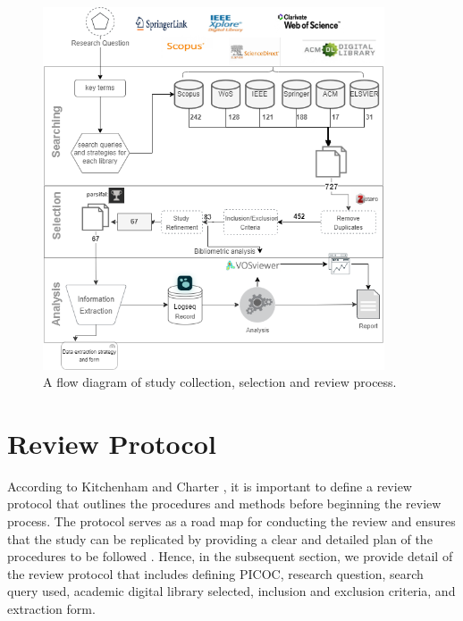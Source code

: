 \begin{figure}[H]
    \centering
    \includegraphics[width=0.9\textwidth]{images/newimages/slrmethoddiagram.drawio2.png}
    \caption{A flow diagram of study collection, selection and review process.}
    \label{fig:slr-proc}
\end{figure}




\section{Review Protocol}
According to Kitchenham and Charter  \cite{kitchenham_guidelines_2007}, it is important to define a review protocol that outlines the procedures and methods before beginning the review process. The protocol serves as a road map for conducting the review and ensures that the study can be replicated by providing a clear and detailed plan of the procedures to be followed \cite{carrera-rivera_how-conduct_2022}. Hence, in the subsequent section, we provide detail of the review protocol that includes defining PICOC, research question, search query used, academic digital library selected, inclusion and exclusion criteria, and extraction form. 

